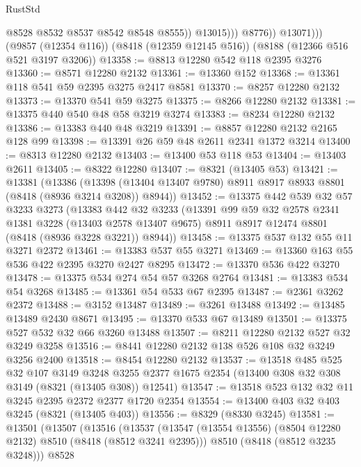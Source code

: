 \begin{lexlean}{RustStd}
\begin{coremodule}
                        @8528
                        @8532
                        @8537
                        @8542
                        @8548
                        @8555))
                    @13015)))
              @8776))
          @13071)))
    (@9857 (@12354 @116))
    (@8418 (@12359 @12145 @516))
    (@8188 (@12366 @516 @521 @3197 @3206))
@13358 := @8813 @12280 @542 @118 @2395 @3276
@13360 := @8571 @12280 @2132
@13361 := @13360 @152
@13368 := @13361 @118 @541 @59 @2395 @3275 @2417 @8581
@13370 := @8257 @12280 @2132
@13373 := @13370 @541 @59 @3275
@13375 := @8266 @12280 @2132
@13381 := @13375 @440 @540 @48 @58 @3219 @3274
@13383 := @8234 @12280 @2132
@13386 := @13383 @440 @48 @3219
@13391 := @8857 @12280 @2132 @2165 @128 @99
@13398 := @13391 @26 @59 @48 @2611 @2341 @1372 @3214
@13400 := @8313 @12280 @2132
@13403 := @13400 @53 @118 @53
@13404 := @13403 @2611
@13405 := @8322 @12280
@13407 := @8321 (@13405 @53)
@13421 := @13381
    (@13386
      (@13398 (@13404 @13407 @9780) @8911 @8917 @8933 @8801 (@8418 (@8936 @3214 @3208)) @8944))
@13452 := @13375
    @442
    @539
    @32
    @57
    @3233
    @3273
    (@13383
      @442
      @32
      @3233
      (@13391
        @99
        @59
        @32
        @2578
        @2341
        @1381
        @3228
        (@13403 @2578 @13407 @9675)
        @8911
        @8917
        @12474
        @8801
        (@8418 (@8936 @3228 @3221))
        @8944))
@13458 := @13375 @537 @132 @55 @11 @3271 @2372
@13461 := @13383 @537 @55 @3271
@13469 := @13360 @163 @55 @536 @422 @2395 @3270 @2427 @8295
@13472 := @13370 @536 @422 @3270
@13478 := @13375 @534 @274 @54 @57 @3268 @2764
@13481 := @13383 @534 @54 @3268
@13485 := @13361 @54 @533 @67 @2395
@13487 := @2361 @3262 @2372
@13488 := @3152 @13487
@13489 := @3261 @13488
@13492 := @13485 @13489 @2430 @8671
@13495 := @13370 @533 @67 @13489
@13501 := @13375 @527 @532 @32 @66 @3260 @13488
@13507 := @8211 @12280 @2132 @527 @32 @3249 @3258
@13516 := @8441 @12280 @2132 @138 @526 @108 @32 @3249 @3256 @2400
@13518 := @8454 @12280 @2132
@13537 := @13518
    @485
    @525
    @32
    @107
    @3149
    @3248
    @3255
    @2377
    @1675
    @2354
    (@13400 @308 @32 @308 @3149 (@8321 (@13405 @308)) @12541)
@13547 := @13518 @523 @132 @32 @11 @3245 @2395 @2372 @2377 @1720 @2354
@13554 := @13400 @403 @32 @403 @3245 (@8321 (@13405 @403))
@13556 := @8329 (@8330 @3245)
@13581 := @13501
    (@13507
      (@13516
        (@13537
          (@13547 (@13554 @13556) (@8504 @12280 @2132) @8510 (@8418 (@8512 @3241 @2395)))
          @8510
          (@8418 (@8512 @3235 @3248)))
        @8528

\end{coremodule}
\end{lexlean}
